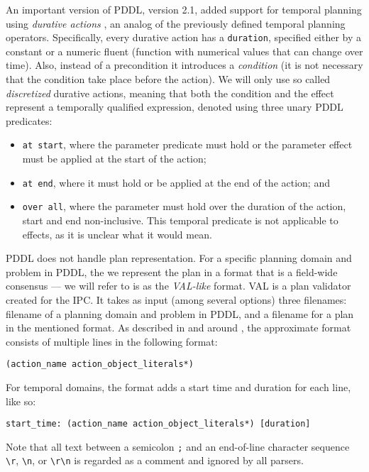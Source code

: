An important version of PDDL, version 2.1, added support for temporal
planning using \textit{durative actions} \citep[Section~5]{Fox2003},
an analog of the previously defined temporal planning operators.
Specifically, every durative action has a \texttt{duration}, specified
either by a constant or a numeric fluent (function with numerical values that
can change over time). Also, instead of a precondition it introduces a \textit{condition} (it is not necessary that the condition take place before the action).
We will only use so called \textit{discretized} durative actions, meaning that both the condition and the effect represent a temporally qualified expression,
denoted using three unary PDDL predicates:
\begin{itemize}
\item \texttt{at start}, where the parameter predicate must hold or the parameter effect must be applied at the start of the action;
\item \texttt{at end}, where it must hold or be applied at the end of the action; and
\item \texttt{over all}, where the parameter must hold over the duration of the action, start and end non-inclusive. This temporal predicate is not applicable to effects, as it is unclear what it would mean.
\end{itemize}

PDDL does not handle plan representation. For a specific planning domain and problem in PDDL,
the we represent the plan in a format that is a field-wide consensus --- we will refer to is
as the \textit{VAL-like} format. VAL \citep{Howey2003} is a plan validator created for the IPC.
It takes as input (among several options) three filenames: filename of a planning domain and
problem in PDDL, and a filename for a plan in the mentioned format.
As described in and around \citet[Figure~2]{Howey2003}, the approximate format
consists of multiple lines in the following format:
\begin{center}
\verb+(action_name action_object_literals*)+
\end{center}

For temporal domains, the format adds a start time and duration for each line, like so:
\begin{center}
\verb+start_time: (action_name action_object_literals*) [duration]+
\end{center}

Note that all text between a semicolon \verb+;+ and an end-of-line character sequence \verb+\r+, \verb+\n+, or \verb+\r\n+ is regarded as a comment and ignored by all parsers.


